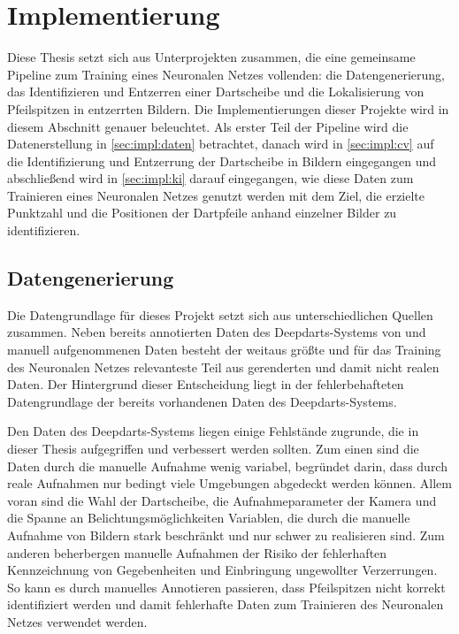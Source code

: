 
\chapter{Implementierung}

Diese Thesis setzt sich aus Unterprojekten zusammen, die eine gemeinsame Pipeline zum Training eines Neuronalen Netzes vollenden: die Datengenerierung, das Identifizieren und Entzerren einer Dartscheibe und die Lokalisierung von Pfeilspitzen in entzerrten Bildern. Die Implementierungen dieser Projekte wird in diesem Abschnitt genauer beleuchtet. Als erster Teil der Pipeline wird die Datenerstellung in \autoref{sec:impl:daten} betrachtet, danach wird in \autoref{sec:impl:cv} auf die Identifizierung und Entzerrung der Dartscheibe in Bildern eingegangen und abschließend wird in \autoref{sec:impl:ki} darauf eingegangen, wie diese Daten zum Trainieren eines Neuronalen Netzes genutzt werden mit dem Ziel, die erzielte Punktzahl und die Positionen der Dartpfeile anhand einzelner Bilder zu identifizieren.

\section{Datengenerierung}
\label{sec:impl:daten}

Die Datengrundlage für dieses Projekt setzt sich aus unterschiedlichen Quellen zusammen. Neben bereits annotierten Daten des Deepdarts-Systems von \citeauthor{deepdarts} \cite{deepdarts-data} und manuell aufgenommenen Daten besteht der weitaus größte und für das Training des Neuronalen Netzes relevanteste Teil aus gerenderten und damit nicht realen Daten. Der Hintergrund dieser Entscheidung liegt in der fehlerbehafteten Datengrundlage der bereits vorhandenen Daten des Deepdarts-Systems.

Den Daten des Deepdarts-Systems liegen einige Fehlstände zugrunde, die in dieser Thesis aufgegriffen und verbessert werden sollten. Zum einen sind die Daten durch die manuelle Aufnahme wenig variabel, begründet darin, dass durch reale Aufnahmen nur bedingt viele Umgebungen abgedeckt werden können. Allem voran sind die Wahl der Dartscheibe, die Aufnahmeparameter der Kamera und die Spanne an Belichtungsmöglichkeiten Variablen, die durch die manuelle Aufnahme von Bildern stark beschränkt und nur schwer zu realisieren sind. Zum anderen beherbergen manuelle Aufnahmen der Risiko der fehlerhaften Kennzeichnung von Gegebenheiten und Einbringung ungewollter Verzerrungen. So kann es durch manuelles Annotieren passieren, dass Pfeilspitzen nicht korrekt identifiziert werden und damit fehlerhafte Daten zum Trainieren des Neuronalen Netzes verwendet werden.

